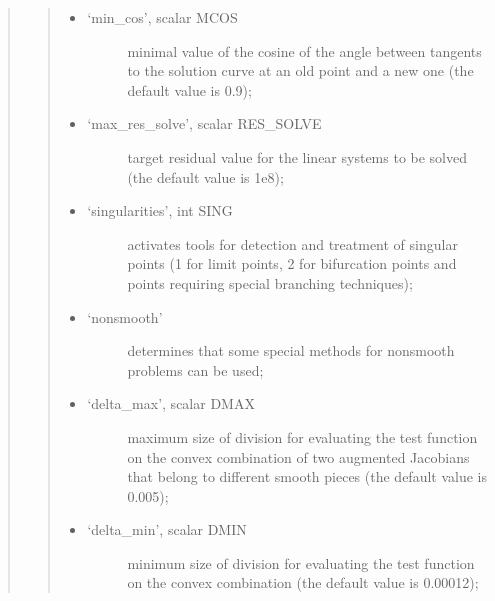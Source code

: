 \documentclass[a4paper,11pt,english]{sphinxmanual}
\begin{document}
\begin{quote}
\begin{quote}
\begin{itemize}
\begin{description}
\end{description}

\item {} \begin{description}
\item[{‘min\_cos’, scalar MCOS}] \leavevmode
minimal value of the cosine of the angle between tangents to the
solution curve at an old point and a new one (the default value is
0.9);

\end{description}

\item {} \begin{description}
\item[{‘max\_res\_solve’, scalar RES\_SOLVE}] \leavevmode
target residual value for the linear systems to be solved (the
default value is 1e\sphinxhyphen{}8);

\end{description}

\item {} \begin{description}
\item[{‘singularities’, int SING}] \leavevmode
activates tools for detection and treatment of singular points (1 for
limit points, 2 for bifurcation points and points requiring special
branching techniques);

\end{description}

\item {} \begin{description}
\item[{‘non\sphinxhyphen{}smooth’}] \leavevmode
determines that some special methods for non\sphinxhyphen{}smooth problems can be
used;

\end{description}

\item {} \begin{description}
\item[{‘delta\_max’, scalar DMAX}] \leavevmode
maximum size of division for evaluating the test function on the
convex combination of two augmented Jacobians that belong to different
smooth pieces (the default value is 0.005);

\end{description}

\item {} \begin{description}
\item[{‘delta\_min’, scalar DMIN}] \leavevmode
minimum size of division for evaluating the test function on the
convex combination (the default value is 0.00012);


\end{description}
\end{itemize}
\end{quote}
\end{quote}
\end{document}
